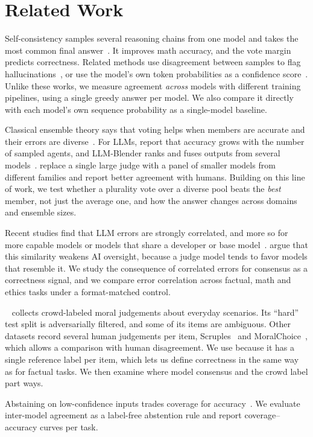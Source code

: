 \section{Related Work}
\label{sec:related}

Self-consistency samples several reasoning chains from one model and takes the most common final answer~\citep{wang2023selfconsistency}.
It improves math accuracy, and the vote margin predicts correctness.
Related methods use disagreement between samples to flag hallucinations~\citep{manakul2023selfcheckgpt,kuhn2023semantic}, or use the model's own token probabilities as a confidence score~\citep{kadavath2022know}.
Unlike these works, we measure agreement {\em across} models with different training pipelines, using a single greedy answer per model.
We also compare it directly with each model's own sequence probability as a single-model baseline.

Classical ensemble theory says that voting helps when members are accurate and their errors are diverse~\citep{dietterich2000ensemble,kuncheva2003diversity}.
For LLMs, \citet{li2024moreagents} report that accuracy grows with the number of sampled agents, and LLM-Blender ranks and fuses outputs from several models~\citep{jiang2023llmblender}.
\citet{verga2024juries} replace a single large judge with a panel of smaller models from different families and report better agreement with humans.
Building on this line of work, we test whether a plurality vote over a diverse pool beats the {\em best} member, not just the average one, and how the answer changes across domains and ensemble sizes.

Recent studies find that LLM errors are strongly correlated, and more so for more capable models or models that share a developer or base model~\citep{goel2025greatmodels,kim2025correlated}.
\citet{goel2025greatmodels} argue that this similarity weakens AI oversight, because a judge model tends to favor models that resemble it.
We study the consequence of correlated errors for consensus as a correctness signal, and we compare error correlation across factual, math and ethics tasks under a format-matched control.

\ethics~\citep{hendrycks2021ethics} collects crowd-labeled moral judgements about everyday scenarios. Its ``hard'' test split is adversarially filtered, and some of its items are ambiguous.
Other datasets record several human judgements per item, \eg Scruples~\citep{lourie2021scruples} and MoralChoice~\citep{scherrer2023moralchoice}, which allows a comparison with human disagreement.
We use \ethics because it has a single reference label per item, which lets us define correctness in the same way as for factual tasks.
We then examine where model consensus and the crowd label part ways.

Abstaining on low-confidence inputs trades coverage for accuracy~\citep{geifman2017selective}.
We evaluate inter-model agreement as a label-free abstention rule and report coverage--accuracy curves per task.
